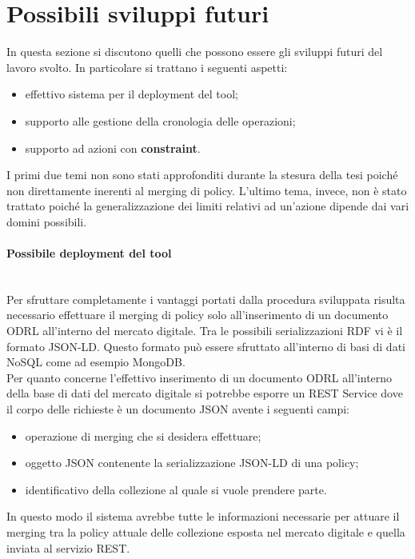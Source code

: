 \documentclass[12pt,a4paper,twoside]{book}
\begin{document}
\section{Possibili sviluppi futuri}
In questa sezione si discutono quelli che possono essere gli sviluppi futuri del lavoro svolto. In particolare si trattano i seguenti aspetti:
\begin{itemize}
\item effettivo sistema per il deployment del tool;
\item supporto alle gestione della cronologia delle operazioni;
\item supporto ad azioni con \textbf{constraint}.
\end{itemize}
I primi due temi non sono stati approfonditi durante la stesura della tesi poiché non direttamente inerenti al merging di policy. L'ultimo tema, invece, non è stato trattato poiché la generalizzazione dei limiti relativi ad un'azione dipende dai vari domini possibili. 
\paragraph{Possibile deployment del tool}\mbox{}\\
Per sfruttare completamente i vantaggi portati dalla procedura sviluppata risulta necessario effettuare il merging di policy solo all'inserimento di un documento ODRL all'interno del mercato digitale. Tra le possibili serializzazioni RDF vi è il formato JSON-LD. Questo formato può essere sfruttato all'interno di basi di dati NoSQL come ad esempio MongoDB.\\
Per quanto concerne l'effettivo inserimento di un documento ODRL all'interno della base di dati del mercato digitale si potrebbe esporre un REST Service dove il corpo delle richieste è un documento JSON avente i seguenti campi:
\begin{itemize}
\item operazione di merging che si desidera effettuare;
\item oggetto JSON contenente la serializzazione JSON-LD di una policy;
\item identificativo della collezione al quale si vuole prendere parte.
\end{itemize}
In questo modo il sistema avrebbe tutte le informazioni necessarie per attuare il merging tra la policy attuale delle collezione esposta nel mercato digitale e quella inviata al servizio REST.
\end{document}

